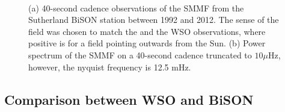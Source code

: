 \begin{figure}[ht!]
	\centering
	 \\ 
	\centering
	\caption{(a) 40-second cadence observations of the SMMF from the Sutherland BiSON station between 1992 and 2012. The sense of the field was chosen to match the \citet{chaplin_studies_2003} and the WSO observations, where positive is for a field pointing outwards from the Sun. (b) Power spectrum of the SMMF on a 40-second cadence truncated to $10 \mu\mathrm{Hz}$, however, the nyquist frequency is 12.5 mHz.}  
	\label{fig:BiSON_SMMF}
\end{figure}


\subsection{Comparison between WSO and BiSON}

